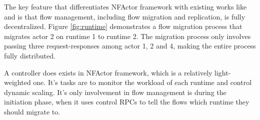 The key feature that differentiates NFActor framework with existing works like \cite{gember2015opennf} and \cite{rajagopalan2013split} is that flow management, including flow migration and replication, is fully decentralized. Figure \ref{fig:runtime} demonstrates a flow migration process that migrates  actor 2 on runtime 1 to runtime 2. The migration process only involves passing three request-responses among actor 1, 2 and 4, making the entire process fully distributed.

A controller does exists in NFActor framework, which is a relatively light-weighted one. It's tasks are to monitor the workload of each runtime and control dynamic scaling. It's only involvement in flow management is during the initiation phase, when it uses control RPCs to tell the flows which runtime they should migrate to.
